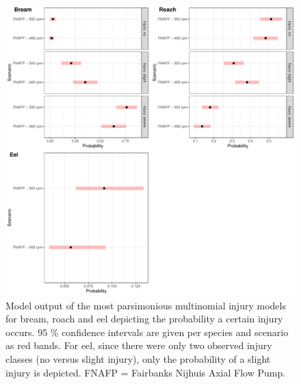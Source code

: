 \documentclass[fleqn,10pt]{wlscirep}
\begin{document}
\begin{figure}[ht]
  \centering
  \includegraphics[scale=0.5]{mult_model_bream_roach_eel_length}
  \caption{Model output of the most parsimonious multinomial injury models for bream, roach and eel depicting the probability a certain injury occurs. 95 \% confidence intervals are given per species and scenario as red bands. For eel, since there were only two observed injury classes (no versus slight injury), only the probability of a slight injury is depicted. FNAFP = Fairbanks Nijhuis Axial Flow Pump.}
  \label{fig:mult_model_bream_roach_eel_length}
\end{figure}
\end{document}
